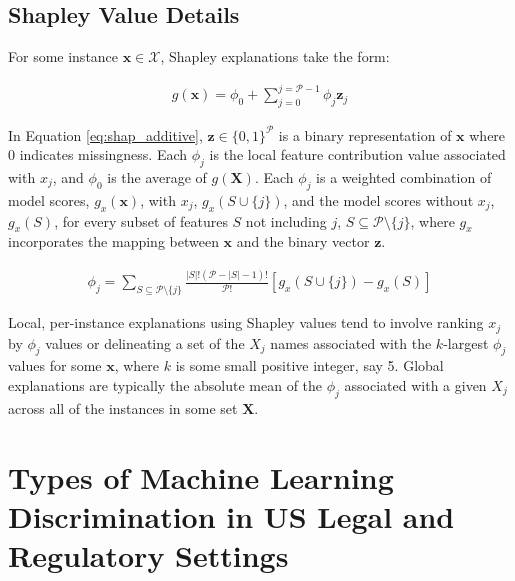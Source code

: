 \documentclass[information,article,submit,moreauthors,pdftex]{definitions/mdpi}
\begin{document}
\subsection{Shapley Value Details}\label{a_ssec:shap}

For some instance $\mathbf{x} \in \mathcal{X}$, Shapley explanations take the form: 

\begin{equation}
\label{eq:shap_additive}
\begin{aligned}
g(\mathbf{x}) = \phi_0 + \sum_{j=0}^{j=\mathcal{P} - 1} \phi_j \mathbf{z}_j
\end{aligned}
\end{equation}

\noindent In Equation \ref{eq:shap_additive}, $\mathbf{z} \in \{0,1\}^\mathcal{P}$ is a binary representation of $\mathbf{x}$ where 0 indicates missingness. Each $\phi_j$ is the local feature contribution value associated with $x_j$, and $\phi_0$ is the average of $g(\mathbf{X})$. Each $\phi_j$ is a weighted combination of model scores, $g_x(\mathbf{x})$, with $x_j$, $g_x(S \cup \{j\})$, and the model scores without $x_j$, $g_x(S)$, for every subset of features $S$ not including $j$, $S \subseteq \mathcal{P} \setminus \{j\}$, where $g_x$ incorporates the mapping between $\mathbf{x}$ and the binary vector $\mathbf{z}$. 

\begin{equation}
\label{eq:shap_contrib}
\begin{aligned}
\phi_{j} = \sum_{S \subseteq \mathcal{P} \setminus \{j\}}\frac{|S|!(\mathcal{P} -|S| -1)!}{\mathcal{P}!}[g_x(S \cup \{j\}) - g_x(S)]
\end{aligned}
\end{equation}

\noindent Local, per-instance explanations using Shapley values tend to involve ranking $x_j$ by $\phi_j$ values or delineating a set of the $X_j$ names associated with the $k$-largest $\phi_j$ values for some $\mathbf{x}$, where $k$ is some small positive integer, say 5. Global explanations are typically the absolute mean of the $\phi_j$ associated with a given $X_j$ across all of the instances in some set $\mathbf{X}$.

\section{Types of Machine Learning Discrimination in US Legal and Regulatory Settings}\label{a_sec:types}
\end{document}
